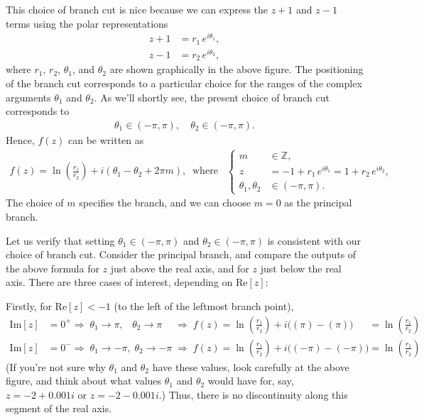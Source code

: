 \documentclass[10pt,a4paper]{article}
\begin{document}
This choice of branch cut is nice because we can express the $z+1$ and
$z - 1$ terms using the polar representations
\begin{align}
  z + 1 &= r_1\,e^{i\theta_1}, \\
  z - 1 &= r_2\, e^{i\theta_2},
\end{align}
where $r_1$, $r_2$, $\theta_1$, and $\theta_2$ are shown graphically
in the above figure. The positioning of the branch cut corresponds to
a particular choice for the ranges of the complex arguments $\theta_1$
and $\theta_2$.  As we'll shortly see, the present choice of branch
cut corresponds to
\begin{align}
  \theta_1 \in (-\pi,\pi), \quad \theta_2 \in (-\pi,\pi).
\end{align}
Hence, $f(z)$ can be written as
\begin{align}
  f(z) = \ln\left(\frac{r_1}{r_2}\right) + i(\theta_1 - \theta_2 + 2\pi m), \;\;\mathrm{where}\;\;\;\left\{\begin{aligned} m &\in\mathbb{Z},\\ z &= -1 + r_1\,e^{i\theta_1} = 1 + r_2\,e^{i\theta_2},\\ \theta_1, \theta_2 &\in (-\pi,\pi).\end{aligned}\right.
\end{align}
The choice of $m$ specifies the branch, and we can choose $m = 0$ as
the principal branch.

Let us verify that setting $\theta_1 \in (-\pi,\pi)$ and $\theta_2 \in
(-\pi,\pi)$ is consistent with our choice of branch cut. Consider the
principal branch, and compare the outputs of the above formula for $z$
just above the real axis, and for $z$ just below the real axis.  There
are three cases of interest, depending on $\mathrm{Re}[z]$:

Firstly, for $\mathrm{Re}[z] < -1$ (to the left of the leftmost branch
point),
\begin{align}
  \mathrm{Im}[z] &= 0^+ \Rightarrow\; \theta_1 \rightarrow \pi, \;\;\; \theta_2 \rightarrow \pi\;\;\;\;\,\Rightarrow\; f(z) = \ln\!\left(\frac{r_1}{r_2}\right) + i\big((\pi) - (\pi)\big) \quad\;\; = \ln\left(\frac{r_1}{r_2}\right) \\
  \mathrm{Im}[z] &= 0^- \Rightarrow\; \theta_1 \rightarrow -\pi, \; \theta_2 \rightarrow -\pi \;\Rightarrow \; f(z) = \ln\!\left(\frac{r_1}{r_2}\right) + i\big((-\pi) - (-\pi)\big) = \ln\left(\frac{r_1}{r_2}\right)
\end{align}
(If you're not sure why $\theta_1$ and $\theta_2$ have these values,
look carefully at the above figure, and think about what values
$\theta_1$ and $\theta_2$ would have for, say, $z = -2 + 0.001i$ or $z
= -2 - 0.001i$.) Thus, there is no discontinuity along this segment of
the real axis.
\end{document}
